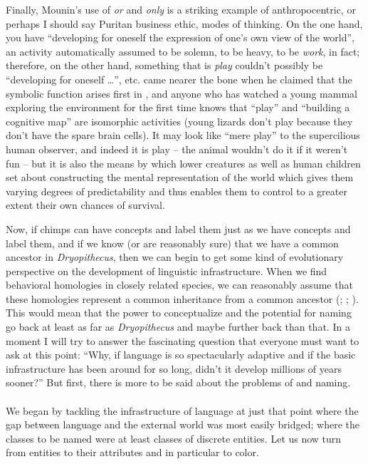 Finally, Mounin's use of \textit{or} and \textit{only} is a striking example of anthropocentric, or perhaps I should say Puritan business ethic, modes of thinking. On the one hand, you have ``developing for oneself the expression of one's own view of the world'', an activity automatically assumed to be solemn, to be heavy, to be \textit{work}, in fact; therefore, on the other hand, something that is \textit{play} couldn't possibly be ``developing for oneself \ldots'', etc. \citet{Piaget1962} came nearer the bone when he claimed that the symbolic function arises first in , and anyone who has watched a young mammal exploring the environment for the first time knows that ``play'' and ``building a cognitive map'' are isomorphic activities (young lizards don't play because they don't have the spare brain cells). It may look like ``mere play'' to the supercilious human observer, and indeed it is play -- the animal wouldn't do it if it weren't fun -- but it is also the means by which lower creatures
as well as human children set about constructing the mental representation of the world which gives them varying degrees of predictability and thus enables them to control to a greater extent their own chances of survival.

Now, if chimps can have concepts and label them just as we have concepts and label them, and if we know (or are reasonably sure) that we have a common ancestor in \textit{Dryopithecus}, then we can begin to get some kind of evolutionary perspective on the development of linguistic infrastructure. When we find behavioral homologies in closely related species, we can reasonably assume that these homologies represent a common inheritance from a common ancestor (\citealt{CampbellEtAl1970}; \citealt{Hodos1976}; \citealt[Figure~1.4]{Dingwall1979}). This would mean that the power to conceptualize and the potential for naming go back at least as far as \textit{Dryopithecus} and maybe further back than that. In a moment I will try to answer the fascinating question that everyone must want to ask at this point: ``Why, if language is so spectacularly adaptive and if the basic infrastructure has been around for so long, didn't it develop millions of years sooner?'' But first, there is more to be said about the problems of  and naming.\\\\

We began by tackling the infrastructure of language at just that point where the gap between language and the external world was most easily bridged; where the classes to be named were at least classes of discrete entities. Let us now turn from entities to their attributes and in particular to color.

